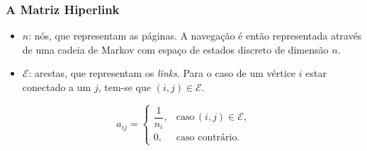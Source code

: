 \documentclass{beamer}
\begin{document}
\begin{frame}
	\frametitle{A Matriz Hiperlink}
	
\begin{itemize}
\item $n$: n\'os, que representam as p\'aginas. A navega\c{c}\~ao \'e ent\~ao representada atrav\'es de uma cadeia de Markov com espa\c{c}o de estados discreto de dimens\~ao $n$.

\vspace{0.3cm}	
	
\item $\mathcal{E}$: arestas, que representam os \textit{links}. Para o caso de um v\'ertice $i$ estar conectado a um $j$, tem-se que $(i,j) \in \mathcal{E}$.
\end{itemize}
	
\begin{equation}
a_{ij} = \begin{cases}
\dfrac{1}{n_i}, & \text{caso}\, (i,j)\in \mathcal{E},\\
0, & \text{caso contr\'ario}.
\end{cases}
\end{equation}	
	
\end{frame}
\end{document}

